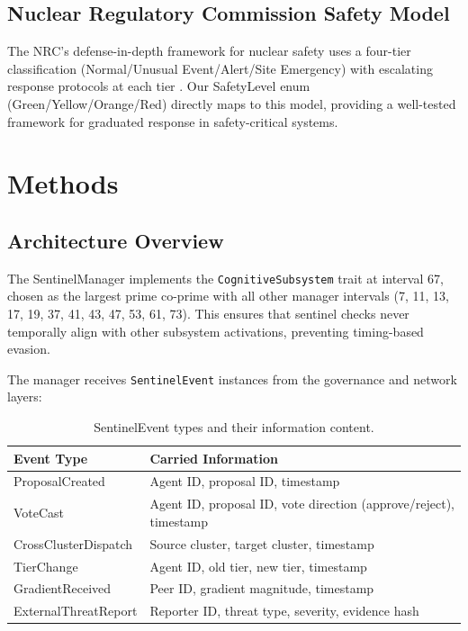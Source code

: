 \documentclass[11pt,a4paper]{article}
\begin{document}
\subsection{Nuclear Regulatory Commission Safety Model}

The NRC's defense-in-depth framework for nuclear safety uses a four-tier classification (Normal/Unusual Event/Alert/Site Emergency) with escalating response protocols at each tier \citep{nrc2011}. Our SafetyLevel enum (Green/Yellow/Orange/Red) directly maps to this model, providing a well-tested framework for graduated response in safety-critical systems.

\section{Methods}

\subsection{Architecture Overview}

The SentinelManager implements the \texttt{CognitiveSubsystem} trait at interval 67, chosen as the largest prime co-prime with all other manager intervals (7, 11, 13, 17, 19, 37, 41, 43, 47, 53, 61, 73). This ensures that sentinel checks never temporally align with other subsystem activations, preventing timing-based evasion.

The manager receives \texttt{SentinelEvent} instances from the governance and network layers:

\begin{table}[h]
\centering
\caption{SentinelEvent types and their information content.}
\label{tab:sentinel_events}
\begin{tabular}{p{3.5cm}p{7.5cm}}
\toprule
\textbf{Event Type} & \textbf{Carried Information} \\
\midrule
ProposalCreated & Agent ID, proposal ID, timestamp \\
VoteCast & Agent ID, proposal ID, vote direction (approve/reject), timestamp \\
CrossClusterDispatch & Source cluster, target cluster, timestamp \\
TierChange & Agent ID, old tier, new tier, timestamp \\
GradientReceived & Peer ID, gradient magnitude, timestamp \\
ExternalThreatReport & Reporter ID, threat type, severity, evidence hash \\
\bottomrule
\end{tabular}
\end{table}
\end{document}
